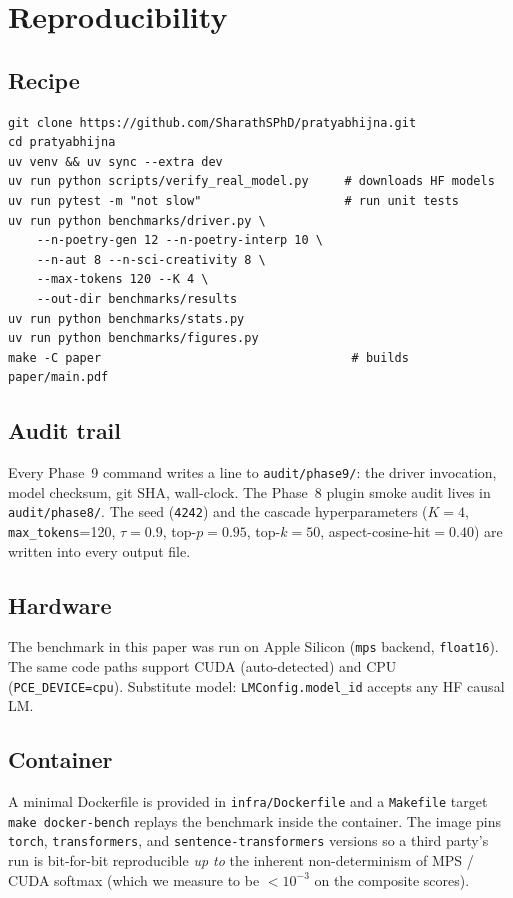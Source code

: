 \section{Reproducibility}\label{app:reproducibility}

\subsection{Recipe}

\begin{verbatim}
git clone https://github.com/SharathSPhD/pratyabhijna.git
cd pratyabhijna
uv venv && uv sync --extra dev
uv run python scripts/verify_real_model.py     # downloads HF models
uv run pytest -m "not slow"                    # run unit tests
uv run python benchmarks/driver.py \
    --n-poetry-gen 12 --n-poetry-interp 10 \
    --n-aut 8 --n-sci-creativity 8 \
    --max-tokens 120 --K 4 \
    --out-dir benchmarks/results
uv run python benchmarks/stats.py
uv run python benchmarks/figures.py
make -C paper                                   # builds paper/main.pdf
\end{verbatim}

\subsection{Audit trail}

Every Phase~9 command writes a line to \texttt{audit/phase9/}: the driver invocation, model checksum, git SHA, wall-clock. The Phase~8 plugin smoke audit lives in \texttt{audit/phase8/}. The seed (\texttt{4242}) and the cascade hyperparameters ($K=4$, \texttt{max\_tokens}=120, $\tau=0.9$, top-$p=0.95$, top-$k=50$, aspect-cosine-hit$=0.40$) are written into every output file.

\subsection{Hardware}

The benchmark in this paper was run on Apple Silicon (\texttt{mps} backend, \texttt{float16}). The same code paths support CUDA (auto-detected) and CPU (\texttt{PCE\_DEVICE=cpu}). Substitute model: \texttt{LMConfig.model\_id} accepts any HF causal LM.

\subsection{Container}

A minimal Dockerfile is provided in \texttt{infra/Dockerfile} and a \texttt{Makefile} target \texttt{make docker-bench} replays the benchmark inside the container. The image pins \texttt{torch}, \texttt{transformers}, and \texttt{sentence-transformers} versions so a third party's run is bit-for-bit reproducible \emph{up to} the inherent non-determinism of MPS / CUDA softmax (which we measure to be $<10^{-3}$ on the composite scores).
